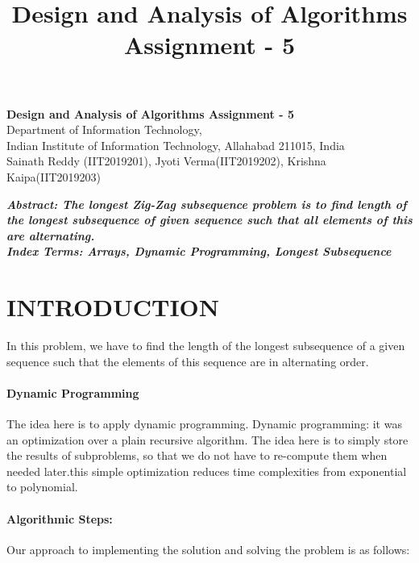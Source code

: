 \documentclass[10pt]{article}
\author{}
\title{\Large{Design and Analysis of Algorithms Assignment - 5}}
\begin{document}
	
	\begin{center}
		{\Large \textbf{Design and Analysis of Algorithms Assignment - 5}}\\
		\vspace{1em}
		{\large Department of Information Technology,}\\
		\vspace{1em}
		\large{Indian Institute of Information Technology, Allahabad 211015, India}\\
		\vspace{1em}
		\large{Sainath Reddy (IIT2019201), Jyoti Verma(IIT2019202), Krishna Kaipa(IIT2019203)}
		\vspace{2.5em}
		
	\end{center}
	
\begin{multicols*}{2}

    \textbf{\emph{{Abstract}: The longest Zig-Zag subsequence problem is to find length of the longest subsequence of given sequence such that all elements of this are alternating.}}\\
	
	\textbf{\emph{{Index Terms}: Arrays, Dynamic Programming, Longest Subsequence}}

\section*{INTRODUCTION}
 
In this problem, we have to find the length of the longest subsequence of a given sequence such that the elements of this sequence are in alternating order.

\paragraph{Dynamic Programming}
The idea here is to apply dynamic programming. Dynamic programming: it was an optimization over a plain recursive algorithm. The idea here is to simply store the results of subproblems, so that we do not have to re-compute them when needed later.this simple optimization reduces time complexities from exponential to polynomial.


\paragraph{Algorithmic Steps:}

Our approach to implementing the solution and solving the problem is as follows:
\begin{enumerate}


\end{enumerate}
\end{multicols*}
\end{document}

